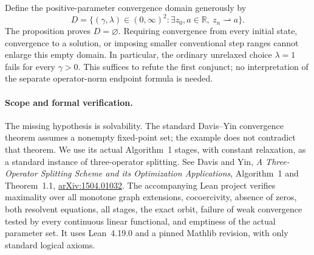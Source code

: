 \documentclass[11pt]{article}
\begin{document}
Define the positive-parameter convergence domain generously by
\[
 D=\{(\gamma,\lambda)\in(0,\infty)^2:
       \exists z_0,a\in\mathbb R,\ z_n\rightharpoonup a\}.
\]
The proposition proves $D=\varnothing$. Requiring convergence from every initial state, convergence to a solution, or imposing smaller conventional step ranges cannot enlarge this empty domain. In particular, the ordinary unrelaxed choice $\lambda=1$ fails for every $\gamma>0$. This suffices to refute the first conjunct; no interpretation of the separate operator-norm endpoint formula is needed.

\paragraph{Scope and formal verification.}
The missing hypothesis is solvability. The standard Davis--Yin convergence theorem assumes a nonempty fixed-point set; the example does not contradict that theorem. We use its actual Algorithm~1 stages, with constant relaxation, as a standard instance of three-operator splitting. See Davis and Yin, \emph{A Three-Operator Splitting Scheme and its Optimization Applications}, Algorithm~1 and Theorem~1.1, \href{https://arxiv.org/abs/1504.01032}{arXiv:1504.01032}.
The accompanying Lean project verifies maximality over all monotone graph extensions, cocoercivity, absence of zeros, both resolvent equations, all stages, the exact orbit, failure of weak convergence tested by every continuous linear functional, and emptiness of the actual parameter set. It uses Lean~4.19.0 and a pinned Mathlib revision, with only standard logical axioms.
\end{document}
